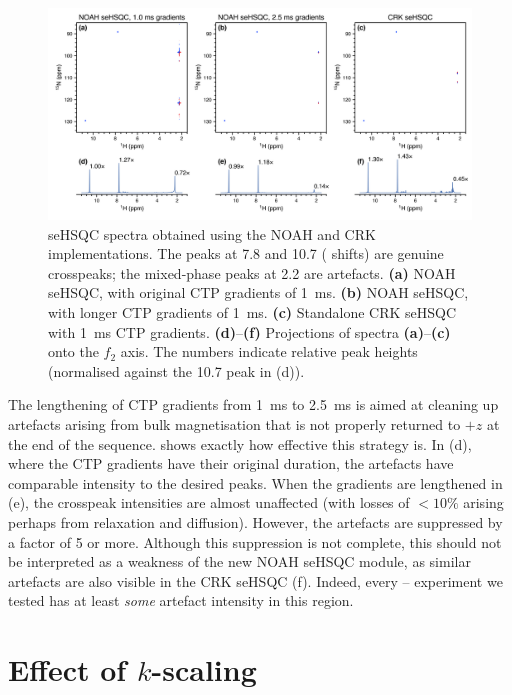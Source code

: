 \begin{figure}
    \centering
    \includegraphics[width=\textwidth]{./figures/cnst16_diff.png}
    \caption{
        \nitrogen{} seHSQC spectra obtained using the NOAH and CRK implementations.
        The peaks at 7.8 and \SI{10.7}{\ppm} (\proton{} shifts) are genuine crosspeaks; the mixed-phase peaks at \SI{2.2}{\ppm} are artefacts.
        \textbf{(a)} NOAH seHSQC, with original CTP gradients of \SI{1}{\ms}.
        \textbf{(b)} NOAH seHSQC, with longer CTP gradients of \SI{1}{\ms}.
        \textbf{(c)} Standalone CRK seHSQC with \SI{1}{\ms} CTP gradients.
        \textbf{(d)}--\textbf{(f)} Projections of spectra \textbf{(a)}--\textbf{(c)} onto the $f_2$ axis.
        The numbers indicate relative peak heights (normalised against the \SI{10.7}{\ppm} peak in (d)).
        \zolmi{}
    }
    \label{fig:cnst16_diff}
\end{figure}

The lengthening of CTP gradients from \SI{1}{\ms} to \SI{2.5}{\ms} is aimed at cleaning up artefacts arising from bulk magnetisation that is not properly returned to $+z$ at the end of the sequence.
 shows exactly how effective this strategy is.
In (d), where the CTP gradients have their original duration, the artefacts have comparable intensity to the desired peaks.
When the gradients are lengthened in (e), the crosspeak intensities are almost unaffected (with losses of $<10\%$ arising perhaps from relaxation and diffusion).
However, the artefacts are suppressed by a factor of 5 or more.
Although this suppression is not complete, this should not be interpreted as a weakness of the new NOAH seHSQC module, as similar artefacts are also visible in the CRK seHSQC (f).
Indeed, every \nitrogen{}--\proton{} experiment we tested has at least \textit{some} artefact intensity in this region.

\section{Effect of \texorpdfstring{$k$}{k}-scaling}

